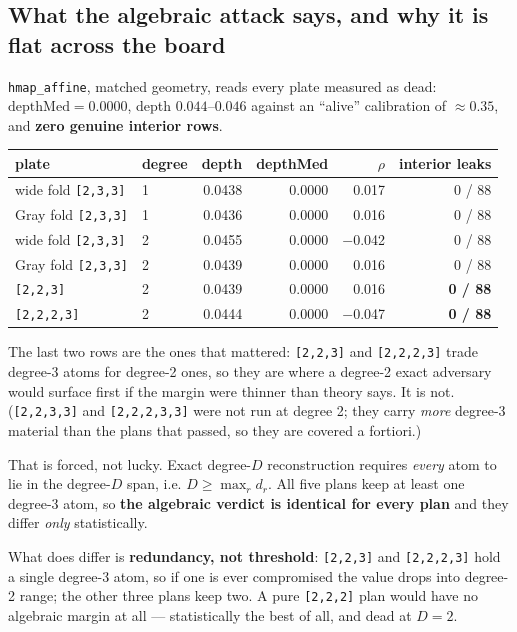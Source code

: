 \documentclass[11pt]{article}
\newcommand{\code}[1]{\texttt{#1}}
\begin{document}
\subsection{What the algebraic attack says, and why it is flat across the board}

\code{hmap\_affine}, matched geometry, reads every plate measured as dead:
$\mathrm{depthMed} = 0.0000$, depth $0.044$--$0.046$ against an ``alive''
calibration of ${\approx}0.35$, and \textbf{zero genuine interior rows}.

\begin{center}
\begin{tabular}{llrrrr}
\toprule
plate & degree & depth & depthMed & $\rho$ & interior leaks \\
\midrule
wide fold \code{[2,3,3]} & 1 & 0.0438 & 0.0000 & 0.017 & 0 / 88 \\
Gray fold \code{[2,3,3]} & 1 & 0.0436 & 0.0000 & 0.016 & 0 / 88 \\
wide fold \code{[2,3,3]} & 2 & 0.0455 & 0.0000 & $-$0.042 & 0 / 88 \\
Gray fold \code{[2,3,3]} & 2 & 0.0439 & 0.0000 & 0.016 & 0 / 88 \\
\code{[2,2,3]}   & 2 & 0.0439 & 0.0000 & 0.016 & \textbf{0 / 88} \\
\code{[2,2,2,3]} & 2 & 0.0444 & 0.0000 & $-$0.047 & \textbf{0 / 88} \\
\bottomrule
\end{tabular}
\end{center}

The last two rows are the ones that mattered: \code{[2,2,3]} and
\code{[2,2,2,3]} trade degree-3 atoms for degree-2 ones, so they are where a
degree-2 exact adversary would surface first if the margin were thinner than
theory says. It is not. (\code{[2,2,3,3]} and \code{[2,2,2,3,3]} were not run at
degree 2; they carry \emph{more} degree-3 material than the plans that passed,
so they are covered a fortiori.)

That is forced, not lucky. Exact degree-$D$ reconstruction requires
\emph{every} atom to lie in the degree-$D$ span, i.e. $D \ge \max_r d_r$. All
five plans keep at least one degree-3 atom, so \textbf{the algebraic verdict is
identical for every plan} and they differ \emph{only} statistically.

What does differ is \textbf{redundancy, not threshold}: \code{[2,2,3]} and
\code{[2,2,2,3]} hold a single degree-3 atom, so if one is ever compromised the
value drops into degree-2 range; the other three plans keep two. A pure
\code{[2,2,2]} plan would have no algebraic margin at all --- statistically the
best of all, and dead at $D=2$.
\end{document}
